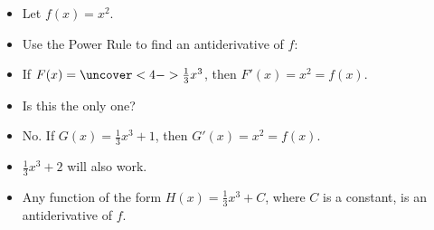 \begin{frame}
\begin{example}
\begin{itemize}
\item  Let $f(x) = x^2$.
\item<2->  Use the Power Rule to find an antiderivative of $f$:
\item<2->  If \alert<handout:0| 3-4>{$F(x) = \uncover<4->{\frac{1}{3}x^3}$}, then $F'(x) = x^2 = f(x)$.
\item<5->  Is this the only one?
\item<6->  No.  If $G(x) = \frac{1}{3}x^3 + 1$, then $G'(x) = x^2 = f(x)$.
\item<7->  $\frac{1}{3}x^3 + 2$ will also work.
\item<8->  Any function of the form $H(x) = \frac{1}{3}x^3 + C$, where $C$ is a constant, is an antiderivative of $f$.
\end{itemize}
\end{example}
\end{frame}
